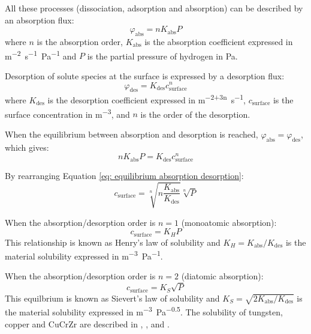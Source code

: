 All these processes (dissociation, adsorption and absorption) can be described by an absorption flux:
\begin{equation}
    \varphi_\mathrm{abs} = n K_\mathrm{abs} P
\end{equation}
where $n$ is the absorption order, $K_\mathrm{abs}$ is the absorption coefficient expressed in \si{m^{-2}.s^{-1}.Pa^{-1}} and $P$ is the partial pressure of hydrogen in \si{Pa}.

Desorption of solute species at the surface is expressed by a desorption flux:
\begin{equation}
    \varphi_\mathrm{des} = K_\mathrm{des} c_\mathrm{surface}^n
\end{equation}
where $K_\mathrm{des}$ is the desorption coefficient expressed in \si{m^{-2+3n}.s^{-1}}, $c_\mathrm{surface}$ is the surface concentration in \si{m^{-3}}, and $n$ is the order of the desorption.

When the equilibrium between absorption and desorption is reached, $\varphi_\mathrm{abs} = \varphi_\mathrm{des}$, which gives:
\begin{equation}
    n K_\mathrm{abs} P = K_\mathrm{des} c_\mathrm{surface}^n
    \label{eq: equilibrium absorption desorption}
\end{equation}

By rearranging Equation \ref{eq: equilibrium absorption desorption}:
\begin{equation}
    c_\mathrm{surface} = \sqrt[n]{n \frac{K_\mathrm{abs}}{K_\mathrm{des}}} \sqrt[n]{P}
\end{equation}

When the absorption/desorption order is $n=1$ (monoatomic absorption):
\begin{equation}
    c_\mathrm{surface} = K_H P
\end{equation}
This relationship is known as Henry's law of solubility and $K_H = K_\mathrm{abs}/K_\mathrm{des}$ is the material solubility expressed in \si{m^{-3}.Pa^{-1}}.

When the absorption/desorption order is $n=2$ (diatomic absorption):
\begin{equation}
    c_\mathrm{surface} = K_S \sqrt{P}
\end{equation}
This equilbrium is known as Sievert's law of solubility and $K_S = \sqrt{2 K_\mathrm{abs}/K_\mathrm{des}}$ is the material solubility expressed in \si{m^{-3}.Pa^{-0.5}}.
The solubility of tungsten, copper and CuCrZr are described in , ,  and .

